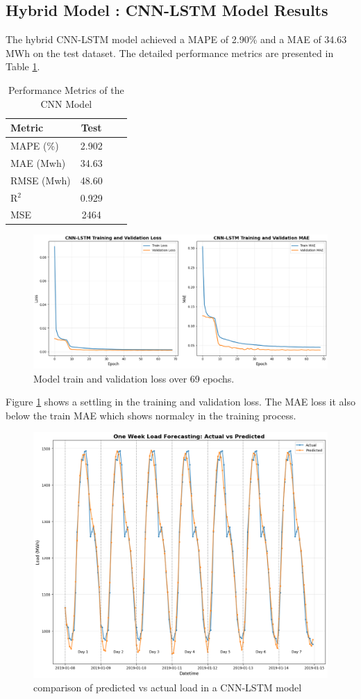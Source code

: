 \subsection{Hybrid Model : CNN-LSTM Model Results}
The hybrid CNN-LSTM model achieved a MAPE of 2.90\% and a MAE of 34.63 MWh on the test dataset. The detailed performance metrics are presented in Table \ref{tab:cnn-lstm-results}.
  \begin{table}[h!]
 	\centering
 	\caption{Performance Metrics of the CNN Model}
 	\label{tab:cnn-lstm-results}
 	\begin{tabular}{lccc}
 		\hline
 		\textbf{Metric} & \textbf{Test} \\
 		\hline
 		MAPE (\%) &  2.902 \\
 		MAE (Mwh) &   34.63  \\
 		RMSE (Mwh) &  48.60  \\
 		R$^2$ &  0.929  \\
 		MSE & 2464  \\
 		\hline
 	\end{tabular}
 \end{table}
 \begin{figure}[h!]
 	\centering
 	\includegraphics[width=0.9\linewidth,height=0.3\textwidth]{Chapters/images/results/CNN-LSTM-MODEL-LOSS}
 	\caption{Model train and validation loss over 69 epochs.}
 	\label{fig:cnn-lstm-model-loss}
 \end{figure}
Figure \ref{fig:cnn-lstm-model-loss} shows a settling in the training and validation loss. The MAE loss it also below the train MAE which shows normalcy in the training process. 
 \begin{figure}[h!]
 	\centering
 	\includegraphics[width=0.9\linewidth,height=0.38\textwidth]{Chapters/images/results/cnn_lstm_prediction_vs_actual}
 	\caption{comparison of predicted vs actual load in a CNN-LSTM model}
 	\label{fig:cnnlstmpredictionvsactual}
 \end{figure}
 
